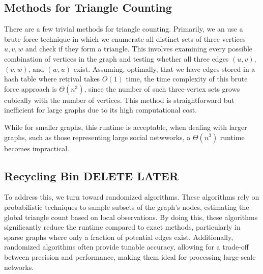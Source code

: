\documentclass[12pt]{article}
\begin{document}
\subsection{Methods for Triangle Counting}

There are a few trivial methods for triangle counting.
Primarily, we an use a brute force technique in which we enumerate all distinct sets of three vertices ${u, v, w}$ and check if they form a triangle.
This involves examining every possible combination of vertices in the graph and testing whether all three edges $(u, v)$, $(v, w)$, and $(w, u)$ exist.
Assuming, optimally, that we have edges stored in a hash table where retrival takes $O(1)$ time, the time complexity of this brute force approach is $\Theta(n^3)$, since the number of such three-vertex sets grows cubically with the number of vertices. \cite{al_hasan_triangle_2018}
This method is straightforward but inefficient for large graphs due to its high computational cost.

While for smaller graphs, this runtime is acceptable, when dealing with larger graphs, such as those representing large social netwworks, a $\Theta(n^3)$ runtime becomes impractical.


\subsection{Recycling Bin DELETE LATER}

To address this, we turn toward randomized algorithms. These algorithms rely on probabilistic techniques to sample subsets of the graph's nodes, estimating the global triangle count based on local observations.
By doing this, these algorithms significantly reduce the runtime compared to exact methods, particularly in sparse graphs where only a fraction of potential edges exist.
Additionally, randomized algorithms often provide tunable accuracy, allowing for a trade-off between precision and performance, making them ideal for processing large-scale networks.

\newpage


\end{document}

